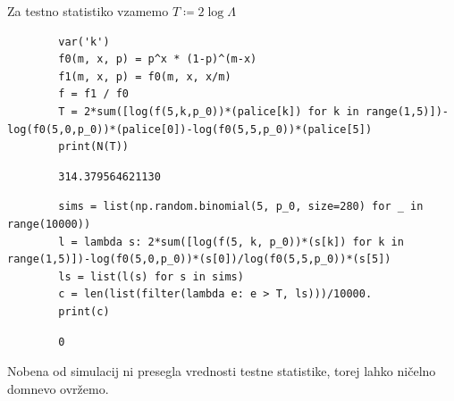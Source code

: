 \documentclass[a4paper]{article}
\begin{document}
\begin{homeworkProblem}
    Za testno statistiko vzamemo \(T ≔ 2\log Λ \)

    \solution
    \begin{verbatim}
        var('k')
        f0(m, x, p) = p^x * (1-p)^(m-x)
        f1(m, x, p) = f0(m, x, x/m)
        f = f1 / f0
        T = 2*sum([log(f(5,k,p_0))*(palice[k]) for k in range(1,5)])-log(f0(5,0,p_0))*(palice[0])-log(f0(5,5,p_0))*(palice[5])
        print(N(T))
    \end{verbatim}
    \begin{verbatim}
        314.379564621130
    \end{verbatim}
    \begin{verbatim}
        sims = list(np.random.binomial(5, p_0, size=280) for _ in range(10000))
        l = lambda s: 2*sum([log(f(5, k, p_0))*(s[k]) for k in range(1,5)])-log(f0(5,0,p_0))*(s[0])/log(f0(5,5,p_0))*(s[5])
        ls = list(l(s) for s in sims)
        c = len(list(filter(lambda e: e > T, ls)))/10000.
        print(c)
    \end{verbatim}
    \begin{verbatim}
        0
    \end{verbatim}

    Nobena od simulacij ni presegla vrednosti testne statistike, torej lahko ničelno domnevo ovržemo.
\end{homeworkProblem}

\newpage
\end{document}
